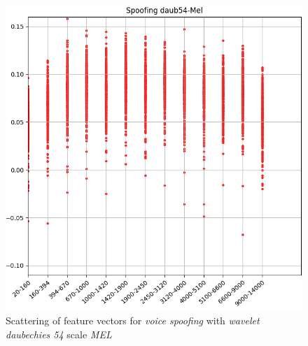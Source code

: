 		\begin{figure}[!h]
			\centering
			\includegraphics[width=.70\linewidth, height=.68\linewidth]{images/results/barkVersusMel/spoofingDaub54Mel}
			\caption{Scattering of feature vectors for \textit{voice spoofing} with \textit{wavelet daubechies 54} scale \textit{MEL}}
			\label{fig:spoofingdaub54mel}
		\end{figure}